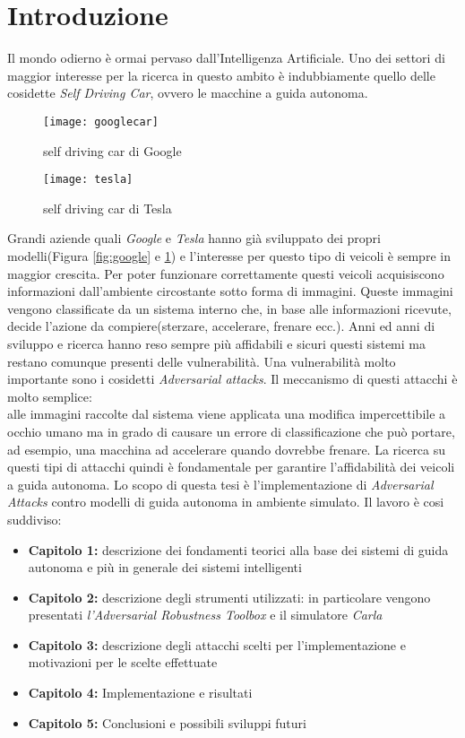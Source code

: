 \chapter*{Introduzione}
Il mondo odierno è ormai pervaso dall'Intelligenza Artificiale. Uno dei settori di maggior interesse per la
ricerca in questo ambito è indubbiamente quello delle cosidette \emph{Self Driving Car}, ovvero
le macchine a guida autonoma. 
\begin{figure}
  \centering
  \parbox{5cm}{
  \texttt{[image: googlecar]}
  \caption{self driving car di Google}
  \label{fig:google}}
  \qquad
  \begin{minipage}{5cm}
  \texttt{[image: tesla]}
  \caption{self driving car di Tesla}
  \label{fig:tesla}
  \end{minipage}
  \end{figure}
Grandi aziende quali \emph{Google} e \emph{Tesla} hanno già sviluppato
dei propri modelli(Figura \ref{fig:google} e \ref{fig:tesla}) e l'interesse per questo tipo di veicoli è sempre in  maggior crescita.
Per poter funzionare correttamente questi veicoli acquisiscono informazioni dall'ambiente circostante sotto forma di immagini.
Queste immagini vengono classificate da un sistema interno che, in base alle informazioni ricevute, decide l'azione da compiere(sterzare, accelerare, frenare ecc.).
Anni ed anni di sviluppo e ricerca hanno reso sempre più affidabili e sicuri  questi sistemi ma restano comunque presenti delle vulnerabilità. Una vulnerabilità
molto importante sono i cosidetti \emph{Adversarial attacks}. Il meccanismo di questi attacchi è molto semplice:
\\
alle immagini raccolte dal sistema viene applicata una modifica impercettibile a occhio umano ma in grado di causare un errore di classificazione che può portare, ad esempio, una macchina ad accelerare quando
dovrebbe frenare. La ricerca su questi tipi di attacchi quindi è fondamentale per garantire l'affidabilità dei veicoli a guida autonoma.
Lo scopo di questa tesi è l'implementazione di \emph{Adversarial Attacks} contro modelli di guida autonoma in ambiente simulato.
Il lavoro è cosi suddiviso:
\begin{itemize}
  \item \textbf{Capitolo 1:} descrizione dei fondamenti teorici alla base dei sistemi di guida autonoma e più in generale dei sistemi intelligenti
  \item \textbf{Capitolo 2:} descrizione degli strumenti utilizzati: in particolare vengono presentati \emph{l'Adversarial Robustness Toolbox} e il simulatore \emph{Carla}
  \item \textbf{Capitolo 3:} descrizione degli attacchi scelti per l'implementazione e  motivazioni per le scelte effettuate
  \item \textbf{Capitolo 4:} Implementazione e risultati
  \item \textbf{Capitolo 5:} Conclusioni e possibili sviluppi futuri
  
\end{itemize}


